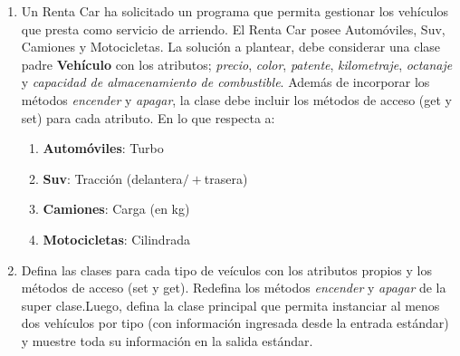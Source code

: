 \documentclass{article}
\begin{document}
\begin{enumerate}
		\newpage
		\item Un Renta Car ha solicitado un programa que permita gestionar los veh\'iculos que presta como servicio de arriendo. El Renta Car posee Autom\'oviles, Suv, Camiones y Motocicletas. La soluci\'on a plantear, debe considerar una clase padre \textbf{Veh\'iculo} con los atributos; \emph{precio}, \emph{color}, \emph{patente}, \emph{kilometraje}, \emph{octanaje} y \emph{capacidad de almacenamiento de combustible}. Adem\'as de incorporar los m\'etodos \emph{encender} y \emph{apagar}, la clase debe incluir los m\'etodos de acceso (get y set) para cada atributo. En lo que respecta a:
		 \begin{enumerate}
		    \item \textbf{Autom\'oviles}: Turbo
		    \item \textbf{Suv}: Tracci\'on (delantera$/+$trasera)
		    \item \textbf{Camiones}: Carga (en kg)
  		    \item \textbf{Motocicletas}: Cilindrada
		\end{enumerate}
		\item[] Defina las clases para cada tipo de ve\'iculos con los atributos propios y los m\'etodos de acceso (set y get). Redefina los m\'etodos \emph{encender} y \emph{apagar} de la super clase.Luego, defina la clase principal que permita instanciar al menos dos veh\'iculos por tipo (con informaci\'on ingresada desde la entrada est\'andar) y muestre toda su informaci\'on en la salida est\'andar. 
	\end{enumerate}
\end{document}
